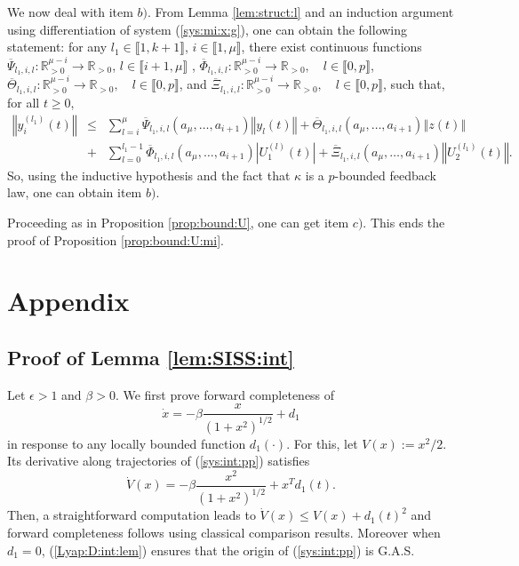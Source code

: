 \documentclass[letterpaper, 10pt]{article}
\newcommand{\rref}[1]{(\ref{#1})}
\newcommand{\norme}[1]{\left\Vert #1\right\Vert}
\newcommand{\abs}[1]{\left| #1 \right|}
\newcommand{\reels}{\mathbb{R}}
\begin{document}
 
We now deal with item $b)$. From Lemma \ref{lem:struct:l} and an induction argument using differentiation of system \rref{sys:mi:x:g}, one can obtain the following statement: for any $l_1 \in \llbracket 1 , k+1 \rrbracket $, $i \in \llbracket 1 , \mu  \rrbracket $, there exist continuous functions $\overline{\Psi}_{l_1,i,l}  :  \reels^{\mu - i}_{>0} \rightarrow \reels_{>0}$, $l \in \llbracket i+1 , \mu  \rrbracket$ , $ \overline{\Phi}_{l_1,i,l} : \reels^{\mu - i}_{>0} \rightarrow \reels_{>0}, \quad l \in \llbracket 0 , p  \rrbracket $,  $\overline{\Theta}_{l_1,i,l} : \reels^{\mu - i}_{>0} \rightarrow \reels_{>0}, \quad l \in \llbracket 0 , p  \rrbracket$, and $\overline{\Xi}_{l_1,i,l} : \reels^{\mu - i}_{>0} \rightarrow \reels_{>0}, \quad l \in \llbracket 0 , p  \rrbracket$, such that, for all $t \geq 0$, 
\begin{eqnarray*}
\norme{y_i^{(l_1)}(t)}&  \leq &  \sum\limits_{l  =i}^{\mu } \overline{\Psi}_{l_1,i,l}(a_\mu , \ldots , a_{i+1}) \norme{y_l(t)} + \overline{\Theta}_{l_1,i,l}(a_\mu , \ldots , a_{i+1}) \norme{z(t)} \\ & + &  \sum\limits_{l  =0}^{l_1-1}  \overline{\Phi}_{l_1,i,l}(a_\mu , \ldots , a_{i+1}) \abs{U_1^{(l)}(t)} + \overline{\Xi}_{l_1,i,l} (a_\mu , \ldots , a_{i+1}) \norme{U_2^{(l_1)}(t)}.
\end{eqnarray*} So, using the inductive hypothesis and the fact that $\kappa$ is a $p$-bounded feedback law, one can obtain item $b)$.


Proceeding as in Proposition \ref{prop:bound:U}, one can get item $c)$. This ends the proof of Proposition \ref{prop:bound:U:mi}.

\section{Appendix}
\subsection{Proof of Lemma \ref{lem:SISS:int} }

Let $\epsilon >1 $ and $\beta >0$. We first prove forward completeness of 
\begin{equation}
\label{sys:int:pp}\dot{x} = - \beta \frac{x} {(1+ x^2)^{1/2}} +d_1
\end{equation}
in response to any locally bounded function $d_1(\cdot) $. For this, let $V(x):= x^2 /2$. Its derivative along trajectories of \rref{sys:int:pp} satisfies
\begin{equation}
\label{Lyap:D:int:lem}
\dot{V}(x) = - \beta  \frac{x^2}{(1+ x^2)^{1/2}}   + x^T d_1(t) .
\end{equation}
Then, a straightforward computation leads to $\dot{V}(x) \leq  V(x)  + d_1(t)^2$
and forward completeness follows using classical comparison results. Moreover when $d_1=0$, \rref{Lyap:D:int:lem} ensures that the origin of \rref{sys:int:pp} is G.A.S.
\end{document}

